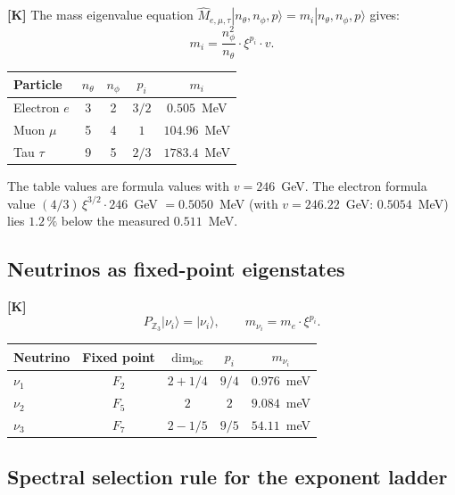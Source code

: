 \textbf{[K]} The mass eigenvalue equation
$\hat{M}_{e,\mu,\tau}|n_\theta,n_\phi,p\rangle = m_i|n_\theta,n_\phi,p\rangle$
gives:
\begin{equation}
  m_i = \frac{n_\phi^2}{n_\theta}\cdot\xi^{p_i}\cdot v.
\end{equation}
\begin{center}
\begin{tabular}{lcccc}
\toprule
Particle & $n_\theta$ & $n_\phi$ & $p_i$ & $m_i$ \\
\midrule
Electron $e$  & 3 & 2 & $3/2$ & $0.505$~MeV \\
Muon $\mu$    & 5 & 4 & $1$   & $104.96$~MeV \\
Tau $\tau$    & 9 & 5 & $2/3$ & $1783.4$~MeV \\
\bottomrule
\end{tabular}
\end{center}
The table values are formula values with $v = 246$~GeV. The electron formula value
$(4/3)\,\xi^{3/2}\cdot 246$~GeV $= 0.5050$~MeV (with $v = 246.22$~GeV: $0.5054$~MeV)
lies $1.2\,\%$ below the measured $0.511$~MeV.

\subsection{Neutrinos as fixed-point eigenstates}

\textbf{[K]}
\begin{equation}
  P_{\mathbb{Z}_3}|\nu_i\rangle = |\nu_i\rangle,\qquad
  m_{\nu_i} = m_e\cdot\xi^{p_i}.
\end{equation}
\begin{center}
\begin{tabular}{lcccc}
\toprule
Neutrino & Fixed point & $\dim_{\mathrm{loc}}$ & $p_i$ & $m_{\nu_i}$ \\
\midrule
$\nu_1$ & $F_2$ & $2+1/4$ & $9/4$ & $0.976$~meV \\
$\nu_2$ & $F_5$ & $2$     & $2$   & $9.084$~meV \\
$\nu_3$ & $F_7$ & $2-1/5$ & $9/5$ & $54.11$~meV \\
\bottomrule
\end{tabular}
\end{center}

\subsection{Spectral selection rule for the exponent ladder}

